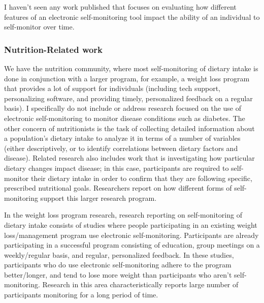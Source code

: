 I haven't seen any work published that focuses on evaluating how different features of an electronic self-monitoring tool impact the ability of an individual to self-monitor over time. 

\subsubsection{Nutrition-Related work}

We have the nutrition community, where most self-monitoring of dietary intake is done in conjunction with a larger program, for example, a weight loss program that provides a lot of support for individuals (including tech support, personalizing software, and providing timely, personalized feedback on a regular basis). I specifically do not include or address research focused on the use of electronic self-monitoring to monitor disease conditions such as diabetes. The other concern of nutritionists is the task of collecting detailed information about a population's dietary intake to analyze it in terms of a number of variables (either descriptively, or to identify correlations between dietary factors and disease). Related research also includes work that is investigating how particular dietary changes impact disease; in this case, participants are required to self-monitor their dietary intake in order to confirm that they are following specific, prescribed nutritional goals. Researchers report on how different forms of self-monitoring support this larger research program. 

In the weight loss program research, research reporting on self-monitoring of dietary intake consists of studies where people participating in an existing weight loss/management program use electronic self-monitoring. Participants are already participating in a successful program consisting of education, group meetings on a weekly/regular basis, and regular, personalized feedback. In these studies, participants who do use electronic self-monitoring adhere to the program better/longer, and tend to lose more weight than participants who aren't self-monitoring. Research in this area characteristically reports large number of participants monitoring for a long period of time. 


